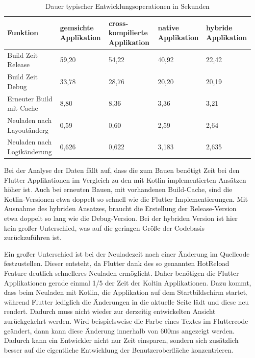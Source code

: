 \begin{table}
\centering
\caption{Dauer typischer Entwicklungsoperationen in Sekunden}
\begin{tabular}{ |p{4cm}||p{2.5cm}|p{2.5cm}|p{2.5cm}|p{2.5cm}| }
 \hline
 Funktion & gemsichte Applikation & cross-kompilierte Applikation & native Applikation & hybride Applikation \\
 \hline
 Build Zeit Release       &   59,20&   54,22& 40,92& 22,42\\
  \hline
 Build Zeit Debug  & 33,78& 28,76& 20,20& 20,19\\
  \hline
 Erneuter Build mit Cache & 8,80& 8,36& 3,36& 3,21\\
  \hline
 Neuladen nach Layoutänderg & 0,59& 0,60& 2,59& 2,64\\
  \hline
 Neuladen nach Logikänderung & 0,626& 0,622& 3,183& 2,635\\
  \hline
\end{tabular}
\label{tab:evaluations_build_time}
\end{table}

Bei der Analyse der Daten fällt auf, dass die zum Bauen benötigt Zeit bei den Flutter Applikationen im Vergleich zu den mit Kotlin implementierten Ansätzen höher ist. 
Auch bei erneuten Bauen, mit vorhandenen Build-Cache, sind die Kotlin-Versionen etwa doppelt so schnell wie die Flutter Implementierungen.
Mit Ausnahme des hybriden Ansatzes, braucht die Erstellung der Release-Version etwa doppelt so lang wie die Debug-Version. 
Bei der hybriden Version ist hier kein großer Unterschied, was auf die geringen Größe der Codebasis zurückzuführen ist.

Ein großer Unterschied ist bei der Neuladezeit nach einer Änderung im Quellcode festzustellen. Dieser entsteht, da Flutter dank des so genannten HotReload Feature deutlich schnelleres Neuladen ermöglicht. Daher benötigen die Flutter Applikationen gerade einmal 1/5 der Zeit der Koltin Applikationen. Dazu kommt, dass beim Neuladen mit Kotlin, die Applikation auf dem Startbildschirm startet, während Flutter lediglich  die Änderungen in die aktuelle Seite lädt und diese neu rendert. Dadurch muss nicht wieder zur derzeitig entwickelten Ansicht zurückgekehrt werden. Wird beispielsweise die Farbe eines Textes im Fluttercode geändert, dann kann diese Änderung innerhalb von 600ms angezeigt werden. Dadurch kann ein Entwickler nicht nur Zeit einsparen, sondern sich zusätzlich besser auf die eigentliche Entwicklung der Benutzeroberfläche konzentrieren.

